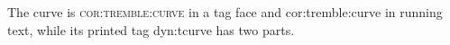 \documentclass{article}
\begin{document}
The curve is \textsc{cor:tremble:curve} in a tag face and cor:tremble:curve in running text,
while its printed tag dyn:tcurve has two parts.
\end{document}
